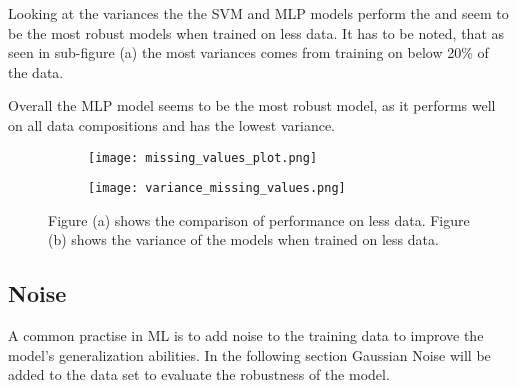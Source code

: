Looking at the variances the the \ac{SVM} and \ac{MLP} models perform the and seem to be the most
robust models when trained on less data.
It has to be noted, that as seen in sub-figure (a) the most variances comes from training on
below 20\% of the data.

Overall the \ac{MLP} model seems to be the most robust model, as it performs well on all data
compositions and has the lowest variance.

\begin{figure}[H]
    \begin{tcolorbox}[arc=0pt,boxrule=0.5pt]
        \centering
        \begin{subfigure}{0.4\textwidth}
            \texttt{[image: missing\_values\_plot.png]}
            \caption{}
            \label{fig:first}
        \end{subfigure}
        \hfill
        \begin{subfigure}{0.4\textwidth}
            \texttt{[image: variance\_missing\_values.png]}
            \caption{}
            \label{fig:second}
        \end{subfigure}
        \hfill
        \label{fig:results-missing-values}
    \end{tcolorbox}
    \caption{Figure (a) shows the comparison of performance on less data. Figure (b) shows the
    variance of the models when trained on less data.}
\end{figure}


%

\subsection{Noise}\label{subsec:noise}
A common practise in \ac{ML} is to add noise to the training data to improve
the model's generalization abilities.
In the following section Gaussian Noise will be added to the data set to evaluate the robustness
of the model.

